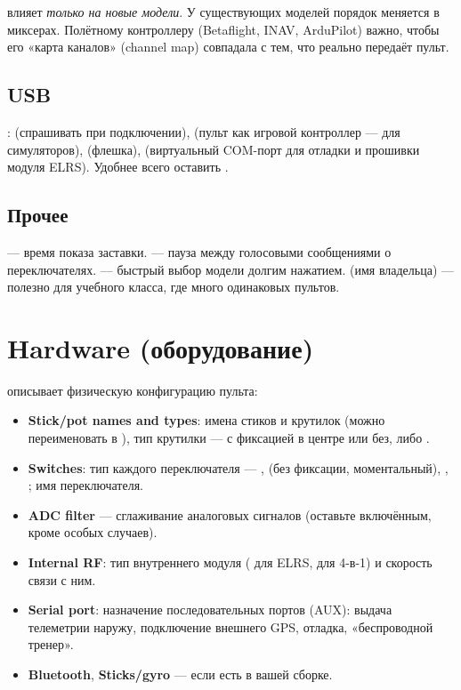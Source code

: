 \begin{note}
 влияет \emph{только на новые модели}. У существующих моделей
порядок меняется в миксерах. Полётному контроллеру (Betaflight, INAV, ArduPilot) важно, чтобы
его «карта каналов» (channel map) совпадала с тем, что реально передаёт пульт.
\end{note}

\subsection{USB}

:  (спрашивать при подключении),  (пульт как
игровой контроллер --- для симуляторов),  (флешка),  (виртуальный
COM-порт для отладки и прошивки модуля ELRS). Удобнее всего оставить .

\subsection{Прочее}

 --- время показа заставки.  --- пауза между
голосовыми сообщениями о переключателях.  --- быстрый выбор модели
долгим нажатием.  (имя владельца) --- полезно для учебного класса,
где много одинаковых пультов.

\section{Hardware (оборудование)}

 описывает физическую конфигурацию пульта:

\begin{itemize}
  \item \textbf{Stick/pot names and types}: имена стиков и крутилок (можно переименовать
         в ), тип крутилки --- с фиксацией в центре или без, либо .
  \item \textbf{Switches}: тип каждого переключателя --- , 
        (без фиксации, моментальный), , ; имя переключателя.
  \item \textbf{ADC filter} --- сглаживание аналоговых сигналов (оставьте включённым,
        кроме особых случаев).
  \item \textbf{Internal RF}: тип внутреннего модуля ( для ELRS, 
        для 4-в-1) и скорость связи с ним.
  \item \textbf{Serial port}: назначение последовательных портов (AUX): выдача телеметрии
        наружу, подключение внешнего GPS, отладка, «беспроводной тренер».
  \item \textbf{Bluetooth}, \textbf{Sticks/gyro} --- если есть в вашей сборке.
\end{itemize}

